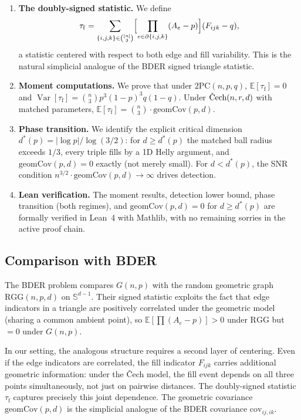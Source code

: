 \documentclass[reqno,12pt]{amsart}
\newcommand{\tauf}{\tau_{\mathrm{f}}}
\newcommand{\PC}{\mathrm{2PC}}
\newcommand{\Cech}{\ifmmode\text{\v{C}ech}\else\v{C}ech\fi}  %
\newcommand{\RGG}{\mathrm{RGG}}
\newcommand{\geomCov}{\mathrm{geomCov}}
\newcommand{\Sph}{\mathbb{S}}
\newcommand{\EE}{\mathbb{E}}
\DeclareMathOperator{\Var}{Var}
\theoremstyle{plain}
\theoremstyle{definition}
\theoremstyle{remark}
\begin{document}
\begin{enumerate}[label=(\arabic*)]
\item \textbf{The doubly-signed statistic.} We define
  \begin{equation}\label{eq:tauf}
    \tauf = \sum_{\{i,j,k\}\in\binom{[n]}{3}}
      \Bigl[\prod_{e\in\partial\{i,j,k\}}(A_e - p)\Bigr](F_{ijk} - q),
  \end{equation}
  a statistic centered with respect to both edge and fill variability. This is the natural
  simplicial analogue of the BDER signed triangle statistic.

\item \textbf{Moment computations.} We prove that under $\PC(n,p,q)$,
  $\EE[\tauf] = 0$ and $\Var[\tauf] = \binom{n}{3}p^3(1-p)^3 q(1-q)$. Under
  $\Cech(n,r,d)$ with matched parameters, $\EE[\tauf] = \binom{n}{3}\cdot\geomCov(p,d)$.

\item \textbf{Phase transition.} We identify the explicit critical dimension
  $d^*(p) = |\log p|/\log(3/2)$: for $d \geq d^*(p)$ the matched ball radius exceeds $1/3$,
  every triple fills by a 1D Helly argument, and $\geomCov(p,d) = 0$ exactly
  (not merely small). For $d < d^*(p)$, the SNR condition $n^{3/2}\cdot\geomCov(p,d)\to\infty$
  drives detection.

\item \textbf{Lean verification.} The moment results, detection lower bound, phase
  transition (both regimes), and $\geomCov(p,d) = 0$ for $d \geq d^*(p)$ are formally
  verified in Lean~4 with Mathlib, with no remaining sorries in the active proof chain.
\end{enumerate}

\subsection{Comparison with BDER}

The BDER problem compares $G(n,p)$ with the random geometric graph $\RGG(n,p,d)$ on
$\Sph^{d-1}$. Their signed statistic exploits the fact that edge indicators in a triangle
are positively correlated under the geometric model (sharing a common ambient point), so
$\EE[\prod(A_e-p)] > 0$ under $\RGG$ but $= 0$ under $G(n,p)$.

In our setting, the analogous structure requires a second layer of centering. Even if the
edge indicators are correlated, the fill indicator $F_{ijk}$ carries additional geometric
information: under the \v{C}ech model, the fill event depends on all three points
simultaneously, not just on pairwise distances. The doubly-signed statistic $\tauf$ captures
precisely this joint dependence. The geometric covariance $\geomCov(p,d)$ is the simplicial
analogue of the BDER covariance $\mathrm{cov}_{ij,ik}$.
\end{document}
